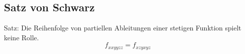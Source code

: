 \subsection{Satz von Schwarz}
    Satz: Die Reihenfolge von partiellen Ableitungen einer stetigen Funktion spielt keine Rolle.
    $$
        f_{xxyyzz} = f_{xzyxyz}
    $$
    \vspace{-1em}
